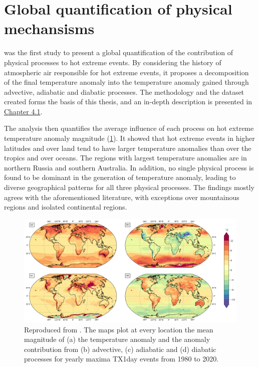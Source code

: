 \documentclass[11pt,a4paper,twoside,openright]{report}
\theoremstyle{definition}
\begin{document}
\section{Global quantification of physical mechansisms}\label{global-quantification-of-physical-mechansisms}

\cite{rothlisberger_quantifying_2023} was the first study to present a global quantification of the contribution of physical processes to hot extreme events. By considering the history of atmospheric air responsible for hot extreme events, it proposes a decomposition of the final temperature anomaly into the temperature anomaly gained through advective, adiabatic and diabatic processes. The methodology and the dataset created forms the basis of this thesis, and an in-depth description is presented in \hyperref[temperature-anomaly-decomposition]{Chapter 4.1}.

The analysis then quantifies the average influence of each process on hot extreme temperature anomaly magnitude (\ref{fig:decompmean}). It showed that hot extreme events in higher latitudes and over land tend to have larger temperature anomalies than over the tropics and over oceans. The regions with largest temperature anomalies are in northern Russia and southern Australia. In addition, no single physical process is found to be dominant in the generation of temperature anomaly, leading to diverse geographical patterns for all three physical processes. The findings mostly agrees with the aforementioned literature, with exceptions over mountainous regions and isolated continental regions.

\begin{figure}
\includegraphics[width=1\linewidth]{images/mean_contribution} \caption{Reproduced from \cite{rothlisberger_quantifying_2023}. The maps plot at every location the mean magnitude of (a) the temperature anomaly and the anomaly contribution from (b) advective, (c) adiabatic and (d) diabatic processes for yearly maxima TX1day events from 1980 to 2020.}\label{fig:decompmean}
\end{figure}
\end{document}
